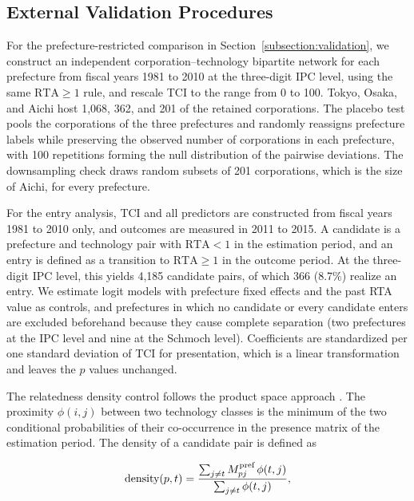 \documentclass[lineno,pdflatex,sn-mathphys-num]{sn-jnl}%
\theoremstyle{thmstyleone}%
\theoremstyle{thmstyletwo}%
\theoremstyle{thmstylethree}%
\begin{document}
\subsection{External Validation Procedures}\label{subsection:validationprocedures}

For the prefecture-restricted comparison in Section~\ref{subsection:validation}, we construct an independent corporation--technology bipartite network for each prefecture from fiscal years 1981 to 2010 at the three-digit IPC level, using the same $\mbox{RTA} \geq 1$ rule, and rescale TCI to the range from 0 to 100.
Tokyo, Osaka, and Aichi host 1,068, 362, and 201 of the retained corporations.
The placebo test pools the corporations of the three prefectures and randomly reassigns prefecture labels while preserving the observed number of corporations in each prefecture, with 100 repetitions forming the null distribution of the pairwise deviations.
The downsampling check draws random subsets of 201 corporations, which is the size of Aichi, for every prefecture.

For the entry analysis, TCI and all predictors are constructed from fiscal years 1981 to 2010 only, and outcomes are measured in 2011 to 2015.
A candidate is a prefecture and technology pair with $\mbox{RTA} < 1$ in the estimation period, and an entry is defined as a transition to $\mbox{RTA} \geq 1$ in the outcome period.
At the three-digit IPC level, this yields 4,185 candidate pairs, of which 366 (8.7\%) realize an entry.
We estimate logit models with prefecture fixed effects and the past RTA value as controls, and prefectures in which no candidate or every candidate enters are excluded beforehand because they cause complete separation (two prefectures at the IPC level and nine at the Schmoch level).
Coefficients are standardized per one standard deviation of TCI for presentation, which is a linear transformation and leaves the $p$ values unchanged.

The relatedness density control follows the product space approach \cite{hidalgo2007product}.
The proximity $\phi(i,j)$ between two technology classes is the minimum of the two conditional probabilities of their co-occurrence in the presence matrix of the estimation period.
The density of a candidate pair is defined as

\begin{equation}\label{eq9}
\mbox{density}(p,t) = \frac{\sum_{j \neq t} M^{\mbox{\scriptsize pref}}_{pj}\, \phi(t,j)}{\sum_{j \neq t} \phi(t,j)},
\end{equation}
\end{document}
